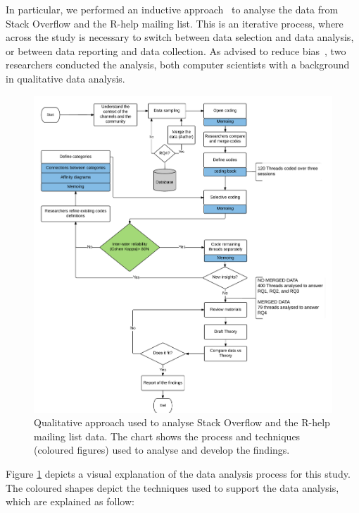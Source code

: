 \documentclass{sig-alternate-05-2015}
\begin{document}
In particular, we performed an inductive approach~\cite{Runeson2012} to analyse the data from Stack Overflow and the R-help mailing list.
This is an iterative process, where across the study is necessary to switch between data selection and data analysis, or between data reporting and data collection.
As advised to reduce bias~\cite{Runeson2012}, two researchers conducted the analysis, both computer scientists with a background in qualitative data analysis.

	\begin{figure} [!htb]
		\centering
		\includegraphics[width=\columnwidth]{Figures/ContentAnalysisFlow_3}
		\caption[Our content analysis method]{Qualitative approach used to analyse Stack Overflow and the R-help mailing list data. The chart shows the process and techniques (coloured figures) used to analyse and develop the findings.}
		\label{fig:ContentAnalysisFlow}
	\end{figure}

Figure \ref{fig:ContentAnalysisFlow} depicts a visual explanation of the data analysis process for this study.
The coloured shapes depict the techniques used to support the data analysis, which are explained as follow:
\end{document}
